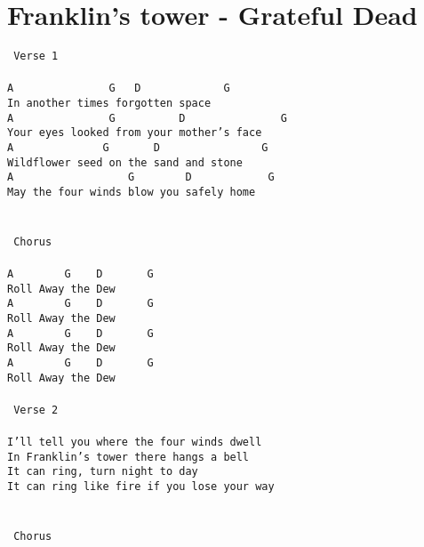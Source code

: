 \newpage
\section{Franklin's tower - Grateful Dead}
\label{Franklin's tower - Grateful Dead}
\texttt{\lbrack\ Verse\ 1\rbrack\\
\\
A\ \ \ \ \ \ \ \ \ \ \ \ \ \ \ G\ \ \ D\ \ \ \ \ \ \ \ \ \ \ \ \ G\\
In\ another\ times\ forgotten\ space\\
A\ \ \ \ \ \ \ \ \ \ \ \ \ \ \ G\ \ \ \ \ \ \ \ \ \ D\ \ \ \ \ \ \ \ \ \ \ \ \ \ \ G\\
Your\ eyes\ looked\ from\ your\ mother's\ face\\
A\ \ \ \ \ \ \ \ \ \ \ \ \ \ G\ \ \ \ \ \ \ D\ \ \ \ \ \ \ \ \ \ \ \ \ \ \ \ G\\
Wildflower\ seed\ on\ the\ sand\ and\ stone\\
A\ \ \ \ \ \ \ \ \ \ \ \ \ \ \ \ \ \ G\ \ \ \ \ \ \ \ D\ \ \ \ \ \ \ \ \ \ \ \ G\\
May\ the\ four\ winds\ blow\ you\ safely\ home\\
\\
\\
\lbrack\ Chorus\rbrack\\
\\
A\ \ \ \ \ \ \ \ G\ \ \ \ D\ \ \ \ \ \ \ G\\
Roll\ Away\ the\ Dew\\
A\ \ \ \ \ \ \ \ G\ \ \ \ D\ \ \ \ \ \ \ G\\
Roll\ Away\ the\ Dew\\
A\ \ \ \ \ \ \ \ G\ \ \ \ D\ \ \ \ \ \ \ G\\
Roll\ Away\ the\ Dew\\
A\ \ \ \ \ \ \ \ G\ \ \ \ D\ \ \ \ \ \ \ G\\
Roll\ Away\ the\ Dew\\
\\
\lbrack\ Verse\ 2\rbrack\\
\\
I'll\ tell\ you\ where\ the\ four\ winds\ dwell\\
In\ Franklin's\ tower\ there\ hangs\ a\ bell\\
It\ can\ ring,\ turn\ night\ to\ day\\
It\ can\ ring\ like\ fire\ if\ you\ lose\ your\ way\\
\\
\\
\lbrack\ Chorus\rbrack\\
}
